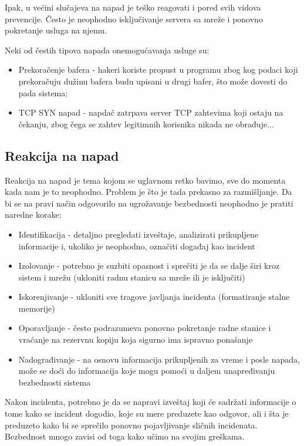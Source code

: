 \documentclass[a4paper]{article}
\begin{document}
Ipak, u većini slučajeva  na napad je teško reagovati i pored svih vidova prevencije. Često je neophodno isključivanje servera sa mreže i ponovno pokretanje usluga na njemu.

Neki od čestih tipova napada onemogućavanja usluge \cite{DoS} su: 
\begin{itemize}
	\item Prekoračenje bafera - hakeri koriste propust u programu zbog kog podaci koji prekoračuju dužinu bafera budu upisani u drugi bafer, što može dovesti do pada sistema;
	\item TCP SYN napad - napdač zatrpava server TCP zahtevima koji ostaju na čekanju, zbog čega se zahtev legitimnih korisnika nikada ne obrađuje...
\end{itemize}

\subsection{Reakcija na napad}

Reakcija na napad \cite{RESP} je tema kojom se uglavnom retko bavimo, sve do momenta kada nam je to neophodno. Problem je što je tada prekasno za razmišljanje. Da bi se na pravi način odgovorilo na ugrožavanje bezbednosti neophodno je pratiti naredne korake:

\begin{itemize}
	\item Identifikacija - detaljno pregledati izveštaje, analizirati prikupljene informacije i, ukoliko je neophodno, označiti događaj kao incident
	\item Izolovanje - potrebno je suzbiti opasnost i sprečiti je da se dalje širi kroz sistem i mrežu (ukloniti radnu stanicu sa mreže ili je isključiti)
	\item Iskorenjivanje - ukloniti sve tragove javljanja incidenta (formatiranje stalne memorije)
	\item Oporavljanje - često podrazumeva ponovno pokretanje radne stanice i vraćanje na rezervnu kopiju koja sigurno ima ispravno ponašanje
	\item Nadograđivanje - na osnovu informacija prikupljenih za vreme i posle napada, može se doći do informacija koje mogu pomoći u daljem unapređivanju bezbednosti sistema
\end{itemize}

Nakon incidenta, potrebno je da se napravi izveštaj koji će sadržati informacije o tome kako se incident dogodio, koje su mere preduzete kao odgovor, ali i šta je preduzeto kako bi se sprečilo ponovno pojavljivanje sličnih incidenata. Bezbednost mnogo zavisi od toga kako učimo na svojim greškama.
\end{document}
